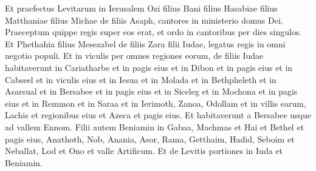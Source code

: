\begin{biblechapter}
\begin{biblechapter}
\begin{biblechapter}
\begin{biblechapter}
\begin{biblechapter}
\begin{biblechapter}
\begin{biblechapter}
\begin{biblechapter}
\begin{biblechapter}
\begin{biblechapter}
\begin{biblechapter}
 \verse Et praefectus Levitarum in Ierusalem Ozi filius Bani filius Hasabiae filius Matthaniae filius Michae de filiis Asaph, cantores in ministerio domus Dei. 
 \verse Praeceptum quippe regis super eos erat, et ordo in cantoribus per dies singulos.
 \verse Et Phethahia filius Mesezabel de filiis Zara filii Iudae, legatus regis in omni negotio populi.
 \verse Et in viculis per omnes regiones eorum, de filiis Iudae habitaverunt in Cariatharbe et in pagis eius et in Dibon et in pagis eius et in Cabseel et in viculis eius 
\verse et in Iesua et in Molada et in Bethpheleth 
\verse et in Asarsual et in Bersabee et in pagis eius 
\verse et in Siceleg et in Mochona et in pagis eius 
\verse et in Remmon et in Saraa et in Ierimoth, 
\verse Zanoa, Odollam et in villis earum, Lachis et regionibus eius et Azeca et pagis eius. Et habitaverunt a Bersabee usque ad vallem Ennom.
 \verse Filii autem Beniamin in Gabaa, Machmas et Hai et Bethel et pagis eius, 
\verse Anathoth, Nob, Anania, 
\verse Asor, Rama, Getthaim, 
\verse Hadid, Seboim et Neballat, 
\verse Lod et Ono et valle Artificum. 
\verse Et de Levitis portiones in Iuda et Beniamin.
 

\end{biblechapter}
\end{biblechapter}
\end{biblechapter}
\end{biblechapter}
\end{biblechapter}
\end{biblechapter}
\end{biblechapter}
\end{biblechapter}
\end{biblechapter}
\end{biblechapter}
\end{biblechapter}
